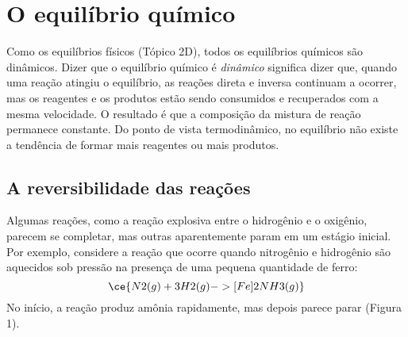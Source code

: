 \section{O equilíbrio químico}

Como os equilíbrios físicos (Tópico 2D), todos os equilíbrios químicos são dinâmicos. Dizer que o equilíbrio químico é \emph{dinâmico} significa dizer
que, quando uma reação atingiu o equilíbrio, as reações direta e inversa continuam a ocorrer, mas os reagentes e os produtos estão sendo consumidos e
recuperados com a mesma velocidade. O resultado é que a composição da mistura de reação permanece constante. Do ponto de vista termodinâmico, no
equilíbrio não existe a tendência de formar mais reagentes ou mais produtos.

\subsection{A reversibilidade das reações}

Algumas reações, como a reação explosiva entre o hidrogênio e o oxigênio, parecem se completar, mas outras aparentemente param em um estágio inicial.
Por exemplo, considere a reação que ocorre quando nitrogênio e hidrogênio são aquecidos sob pressão na presença de uma pequena quantidade de ferro: \[
    \ce{ N2(g) + 3 H2(g) ->[Fe] 2 NH3(g) }
\] No início, a reação produz amônia rapidamente, mas depois parece parar (Figura 1).

